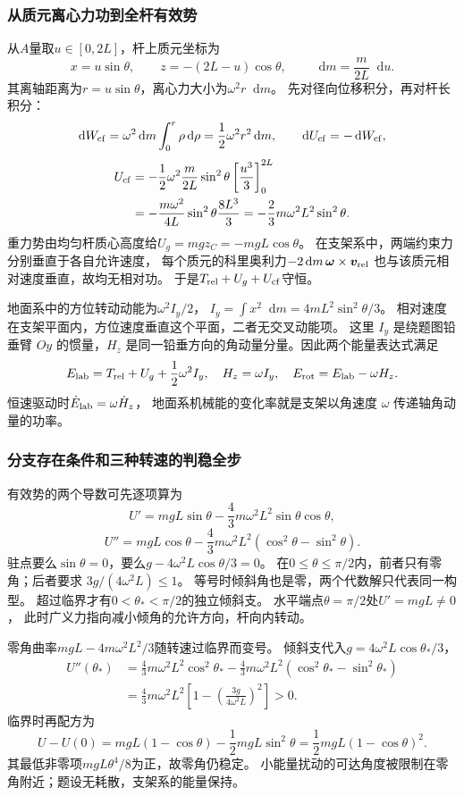 \documentclass[UTF8,fontset=fandol,a4paper,11pt]{ctexart}
\newcommand{\dd}{\mathop{}\!\mathrm{d}}
\begin{document}
\subsubsection*{从质元离心力功到全杆有效势}
从$A$量取$u\in[0,2L]$，杆上质元坐标为
\[
x=u\sin\theta,\qquad z=-(2L-u)\cos\theta,
\qquad\dd m=\frac m{2L}\dd u.
\]
其离轴距离为$r=u\sin\theta$，离心力大小为$\omega^2r\dd m$。
先对径向位移积分，再对杆长积分：
\[
\dd W_{\rm cf}=\omega^2\dd m\int_0^r\rho\dd\rho
=\frac12\omega^2r^2\dd m,
\qquad \dd U_{\rm cf}=-\dd W_{\rm cf},
\]
\[
\begin{aligned}
U_{\rm cf}&=-\frac12\omega^2\frac m{2L}\sin^2\theta
 \left[\frac{u^3}{3}\right]_0^{2L}\\
&=-\frac{m\omega^2}{4L}\sin^2\theta\frac{8L^3}{3}
=-\frac23m\omega^2L^2\sin^2\theta.
\end{aligned}
\]
重力势由均匀杆质心高度给$U_g=mgz_C=-mgL\cos\theta$。
在支架系中，两端约束力分别垂直于各自允许速度，
每个质元的科里奥利力$-2\dd m\,\boldsymbol\omega\times\boldsymbol v_{\rm rel}$
也与该质元相对速度垂直，故均无相对功。
于是$T_{\rm rel}+U_g+U_{\rm cf}$守恒。

地面系中的方位转动动能为$\omega^2I_y/2$，
$I_y=\int x^2\dd m=4mL^2\sin^2\theta/3$。
相对速度在支架平面内，方位速度垂直这个平面，二者无交叉动能项。
这里 $I_y$ 是绕题图铅垂臂 $Oy$ 的惯量，$H_z$ 是同一铅垂方向的角动量分量。因此两个能量表达式满足
\[
E_{\rm lab}=T_{\rm rel}+U_g+\frac12\omega^2I_y,
\quad H_z=\omega I_y,\quad E_{\rm rot}=E_{\rm lab}-\omega H_z.
\]
恒速驱动时$\dot E_{\rm lab}=\omega\dot H_z$，
地面系机械能的变化率就是支架以角速度 $\omega$ 传递轴角动量的功率。

\subsubsection*{分支存在条件和三种转速的判稳全步}
有效势的两个导数可先逐项算为
\[
U'=mgL\sin\theta-\frac43m\omega^2L^2\sin\theta\cos\theta,
\]
\[
U''=mgL\cos\theta-\frac43m\omega^2L^2(\cos^2\theta-\sin^2\theta).
\]
驻点要么$\sin\theta=0$，要么$g-4\omega^2L\cos\theta/3=0$。
在$0\leq\theta\leq\pi/2$内，前者只有零角；后者要求
$3g/(4\omega^2L)\leq1$。
等号时倾斜角也是零，两个代数解只代表同一构型。
超过临界才有$0<\theta_*<\pi/2$的独立倾斜支。
水平端点$\theta=\pi/2$处$U'=mgL\ne0$，
此时广义力指向减小倾角的允许方向，杆向内转动。

零角曲率$mgL-4m\omega^2L^2/3$随转速过临界而变号。
倾斜支代入$g=4\omega^2L\cos\theta_*/3$，
\[
\begin{aligned}
U''(\theta_*)&=\frac43m\omega^2L^2\cos^2\theta_*
-\frac43m\omega^2L^2(\cos^2\theta_*-\sin^2\theta_*)\\
&=\frac43m\omega^2L^2\left[1-
\left(\frac{3g}{4\omega^2L}\right)^2\right]>0.
\end{aligned}
\]
临界时再配方为
\[
U-U(0)=mgL(1-\cos\theta)-\frac12mgL\sin^2\theta
=\frac12mgL(1-\cos\theta)^2.
\]
其最低非零项$mgL\theta^4/8$为正，故零角仍稳定。
小能量扰动的可达角度被限制在零角附近；题设无耗散，支架系的能量保持。
\end{document}
